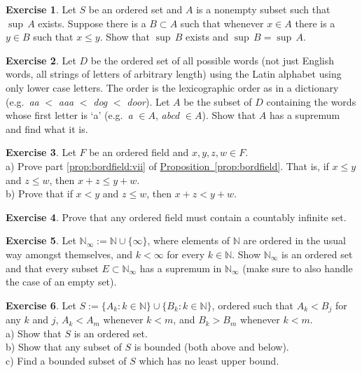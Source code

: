 \documentclass[12pt]{book}
\newcommand{\N}{{\mathbb{N}}}
\theoremstyle{plain}
\theoremstyle{remark}
\theoremstyle{definition}
\theoremstyle{exercise}
\newtheorem{exercise}{Exercise}[section]
\theoremstyle{example}
\newcommand{\propref}[1]{\hyperref[#1]{Proposition~\ref*{#1}}}
\begin{document}
\begin{exercise} \label{exercise:dominatingb}
Let $S$ be an ordered set and
$A$ is a nonempty subset such that $\sup \, A$ exists.  Suppose there
is a $B \subset A$ such that whenever $x \in A$ there is a $y \in B$
such that $x \leq y$.  Show that $\sup \, B$ exists and $\sup \, B = \sup \, A$.
\end{exercise}

\begin{exercise}
Let $D$ be the ordered set of all possible words (not just English words,
all strings of letters of arbitrary length)
using the Latin alphabet using only lower case letters.  The order is the
lexicographic order as in a dictionary (e.g.\ \emph{aa} $<$ \emph{aaa} $<$ \emph{dog} $<$ \emph{door}).
Let $A$ be the subset of $D$ containing the words whose
first letter is `a' (e.g.\ \emph{a} $\in A$, \emph{abcd} $\in A$).
Show that $A$ has a supremum and find what it is.
\end{exercise}

\begin{exercise}
Let $F$ be an ordered field and $x,y,z,w \in F$.
\\
a) Prove part \ref{prop:bordfield:vii} of \propref{prop:bordfield}.
That is,
if $x \leq y$ and $z \leq w$, then $x+z \leq y+w$.
\\
b) Prove that
if $x < y$ and $z \leq w$, then $x+z < y+w$.
\end{exercise}

\begin{exercise}
Prove that any ordered field must contain a countably infinite set.
\end{exercise}

\begin{exercise}
Let $\N_{\infty} := \N \cup \{ \infty \}$, where elements of $\N$ are
ordered in the usual way amongst themselves,
and $k < \infty$ for every $k \in \N$.  Show $\N_{\infty}$ is an ordered set
and that every subset $E \subset \N_{\infty}$ has a supremum in
$\N_{\infty}$ (make sure to also handle the case of an empty set).
\end{exercise}

\begin{exercise}
Let $S := \{ A_k : k \in \N \} \cup \{ B_k : k \in \N \}$, ordered such that
$A_k < B_j$ for any $k$ and $j$,
$A_k < A_m$ whenever $k < m$,
and $B_k > B_m$ whenever $k < m$.\\
a) Show that $S$ is an ordered set.\\
b) Show that any subset of $S$ is bounded (both above and below).\\
c) Find a bounded subset of $S$ which has no least upper bound.
\end{exercise}
\end{document}
